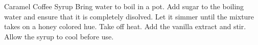 \documentclass[../cookbook.tex]{subfiles}
\begin{document}
\begin{recipe}{Caramel Coffee Syrup}{}{}
    Bring water to boil in a pot.
    Add sugar to the boiling water and ensure that it is completely disolved.
    Let it simmer until the mixture takes on a honey colored hue. Take off heat.
    Add the vanilla extract and stir. Allow the syrup to cool before use.
\end{recipe}
\end{document}
